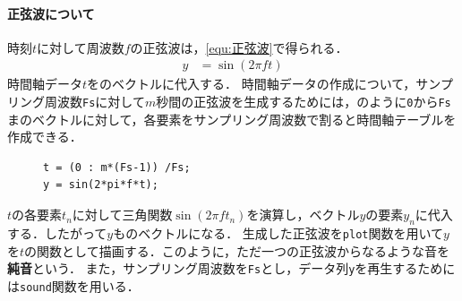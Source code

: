 \paragraph{正弦波について}時刻\(t\)に対して周波数\(f\)の正弦波は，\eqref{equ:正弦波}で得られる．
\begin{align}
    y & =\sin(2\pi ft)\label{equ:正弦波}
\end{align}
時間軸データ\(t\)をのベクトルに代入する．
時間軸データの作成について，サンプリング周波数\texttt{Fs}に対して\(m\)秒間の正弦波を生成するためには，のように\texttt{0}から\texttt{Fs}まのベクトルに対して，各要素をサンプリング周波数で割ると時間軸テーブルを作成できる．\par
\begin{figure}
    \vspace{-1cm}
    \begin{lstlisting}[caption={時間軸作成と正弦波の作成},numbers={none},label={src:時間軸作成と正弦波の作成}]
t = (0 : m*(Fs-1)) /Fs;
y = sin(2*pi*f*t);
\end{lstlisting}
    \vspace{-1cm}
\end{figure}
\(t\)の各要素\(t_n\)に対して三角関数\(\sin(2\pi ft_n)\)を演算し，ベクトル\(y\)の要素\(y_n\)に代入する．したがって\(y\)ものベクトルになる．
生成した正弦波を\texttt{plot}関数を用いて\(y\)を\(t\)の関数として描画する．このように，ただ一つの正弦波からなるような音を\textbf{純音}という．\cite[p.1]{音響工学理論基礎}
また，サンプリング周波数を\texttt{Fs}とし，データ列\texttt{y}を再生するためには\texttt{sound}関数を用いる．\par
